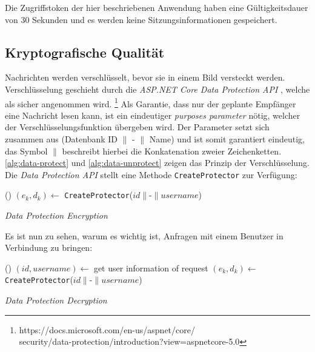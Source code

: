 \noindent
Die Zugriffstoken der hier beschriebenen Anwendung haben eine Gültigkeitsdauer
von 30 Sekunden und es werden keine Sitzungsinformationen gespeichert.

\subsection{Kryptografische Qualität}
Nachrichten werden verschlüsselt, bevor sie in einem Bild versteckt werden.
Verschlüssel\-ung geschieht durch die \textit{ASP.NET Core Data Protection API}
, welche als sicher angenommen wird. \footnote{https://docs.microsoft.com/en-us/aspnet/core/\\
  security/data-protection/introduction?view=aspnetcore-5.0}
Als Garantie, dass nur der geplante Empfänger eine Nachricht lesen
kann, ist ein eindeutiger \textit{purposes parameter} nötig, welcher
der Verschlüsselungsfunktion übergeben wird.
Der Parameter setzt sich zusammen aus (Datenbank ID $\parallel$ - $\parallel$ Name)
und ist somit garantiert eindeutig, das Symbol $\parallel$
beschreibt hierbei die Konkatenation zweier Zeichenketten.
\autoref{alg:data-protect} und \ref{alg:data-unprotect}
zeigen das Prinzip der Verschlüsselung. Die \textit{Data Protection API} stellt
eine Methode \texttt{CreateProtector} zur Verfügung:

\begin{singlespace}
  \begin{algorithm}[h]
    \DontPrintSemicolon
    \Begin(){
      $(e_k, d_k) \leftarrow$ \texttt{CreateProtector}($id \parallel \text{-} \parallel username$)\;
    }
    \caption{\textit{Data Protection Encryption}}
    \label{alg:data-protect}
  \end{algorithm}
\end{singlespace}

\noindent
Es ist nun zu sehen, warum es wichtig ist, Anfragen mit einem Benutzer in Verbindung zu bringen:

\begin{singlespace}
  \begin{algorithm}[h]
    \DontPrintSemicolon
    \Begin(){
      $(id, username) \leftarrow$ get user information of request\;
      $(e_k, d_k) \leftarrow$ \texttt{CreateProtector}($id \parallel \text{-} \parallel username$)\;
    }
    \caption{\textit{Data Protection Decryption}}
    \label{alg:data-unprotect}
  \end{algorithm}
\end{singlespace}

